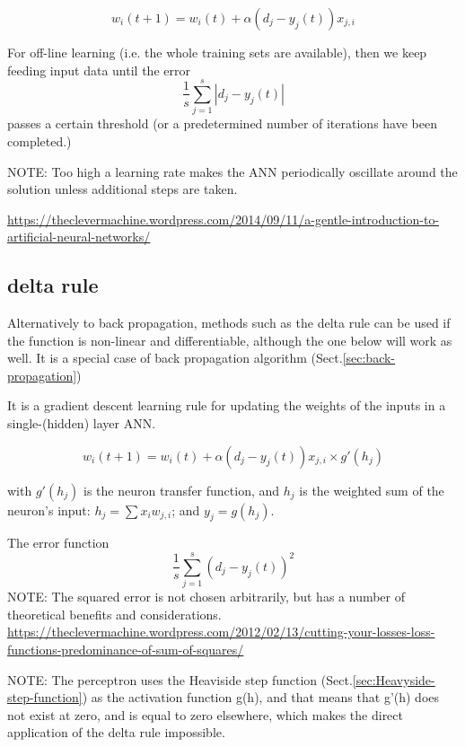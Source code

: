 \begin{equation}
w_i(t+1) = w_i(t) + \alpha (d_j - y_j(t))  x_{j,i}
\end{equation}

For off-line learning (i.e. the whole training sets are available), then we keep
feeding input data until the error 
\begin{equation}
\frac{1}{s}\sum_{j=1}^s |d_j - y_j(t)|
\end{equation}
passes a certain threshold (or a predetermined number of iterations
have been completed.)

NOTE: Too high a learning rate makes the ANN periodically oscillate around the
solution unless additional steps are taken.

\url{https://theclevermachine.wordpress.com/2014/09/11/a-gentle-introduction-to-artificial-neural-networks/}

\subsection{delta rule}
\label{sec:delta-rule}

Alternatively to back propagation, methods such as the delta rule can be used if
the function is non-linear and differentiable, although the one below will work
as well. It is a special case of back propagation algorithm
(Sect.\ref{sec:back-propagation})

It is a gradient descent learning rule for updating the weights of the inputs
in a single-(hidden) layer ANN.

\begin{equation}
w_i(t+1) = w_i(t) + \alpha (d_j - y_j(t))  x_{j,i} \times g'(h_j)
\end{equation}

with $g'(h_j)$ is the neuron transfer function, and $h_j$ is the weighted sum of
the neuron's input: $h_j = \sum x_i w_{j,i}$; and $y_j = g(h_j)$.

The error function
\begin{equation}
\frac{1}{s}\sum_{j=1}^s (d_j - y_j(t))^2
\end{equation}
NOTE: The squared error is not chosen arbitrarily, but has a number of
theoretical benefits and considerations.
\url{https://theclevermachine.wordpress.com/2012/02/13/cutting-your-losses-loss-functions-predominance-of-sum-of-squares/}



NOTE: The perceptron uses the Heaviside step function
(Sect.\ref{sec:Heavyside-step-function}) as the activation function g(h), and
that means that g'(h) does not exist at zero, and is equal to zero elsewhere,
which makes the direct application of the delta rule impossible.
 
